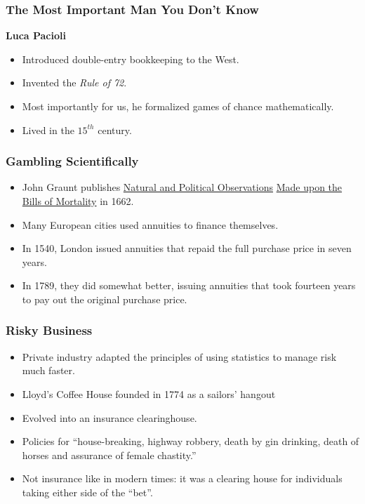 \documentclass{beamer}
\begin{document}

\begin{frame}
\frametitle{The Most Important Man You Don't Know}
\textbf{Luca Pacioli}
\begin{itemize}
    \item Introduced double-entry bookkeeping to the West.
    \item<2-> Invented the \textit{Rule of 72}.
    \item<3-> Most importantly for us, he formalized games of chance
    mathematically.
    \item<4->Lived in the $15^{th}$ century.
\end{itemize}
\end{frame}


\begin{frame}
\frametitle{Gambling Scientifically}
\begin{itemize}
\item John Graunt publishes \underline{Natural and Political Observations} 
 \underline{Made upon the Bills of Mortality} in 1662.\pause
\item Many European cities used annuities to finance themselves.\pause
\item In 1540, London issued annuities that repaid the full purchase price in seven
years.\pause
\item In 1789, they did somewhat better, issuing annuities that took fourteen
years to pay out the original purchase price.\pause
\end{itemize}
\end{frame}


\begin{frame}
\frametitle{Risky Business}
\begin{itemize}
\item Private industry adapted the principles of using statistics to manage
risk much faster.
\item Lloyd's Coffee House founded in 1774 as a sailors' hangout\pause
\item Evolved into an insurance clearinghouse.\pause
\item Policies for ``house-breaking, highway robbery, death by gin
drinking, death of horses and assurance of female chastity.''\pause
\item Not insurance like in modern times:  it was a clearing house for
individuals taking either side of the ``bet''.
\end{itemize}
\end{frame}
\end{document}
